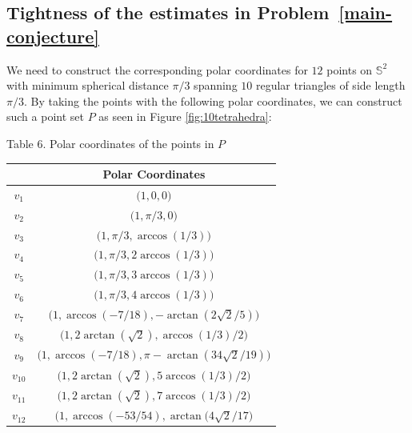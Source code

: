 \documentclass[10pt]{article}
\newtheorem{Remark}{Remark}
\numberwithin{Subcase}{Case}
\begin{document}

\subsection{Tightness of the estimates in Problem~\ref{main-conjecture}}
We need to construct the corresponding polar coordinates for $12$ points on $\mathbb{S}^2$ with minimum spherical distance $\pi/3$ spanning $10$ regular triangles of side length $\pi/3$. By taking the points with the following polar coordinates, we can construct such a point set $P$ as seen in Figure \ref{fig:10tetrahedra}:

\begin{center}
Table 6. Polar coordinates of the points in $P$
\begin{table}[h!]
\begin{center}
\begin{tabular}{|c|c|}
\hline
 & Polar Coordinates \\ \hline
$v_{1}$ & $\Big(1,0,0\Big)$ \\ \hline
$v_{2}$ & $\Big(1,\pi/3,0\Big)$ \\ \hline
$v_{3}$ & $\Big(1,\pi/3,\arccos(1/3)\Big)$ \\ \hline
$v_{4}$ & $\Big(1,\pi/3,2\arccos(1/3)\Big)$ \\ \hline
$v_{5}$ & $\Big(1,\pi/3,3\arccos(1/3)\Big)$ \\ \hline
$v_{6}$ & $\Big(1,\pi/3,4\arccos(1/3)\Big)$ \\ \hline
$v_{7}$ & $\Big(1,\arccos(-7/18),-\arctan(2\sqrt{2}/5)\Big)$ \\ \hline
$v_{8}$ & $\Big(1,2\arctan(\sqrt{2}),\arccos(1/3)/2\Big)$ \\ \hline
$v_{9}$ & $\Big(1,\arccos(-7/18),\pi-\arctan(34\sqrt{2}/19)\Big)$ \\ \hline
$v_{10}$ & $\Big(1,2\arctan(\sqrt{2}),5\arccos(1/3)/2\Big)$ \\ \hline
$v_{11}$ & $\Big(1,2\arctan(\sqrt{2}),7\arccos(1/3)/2\Big)$ \\ \hline
$v_{12}$ & $\Big(1,\arccos(-53/54),\arctan(4\sqrt{2}/17\Big)$ \\ \hline
\end{tabular}
\end{center}
\end{table}
\end{center}
\end{document}

